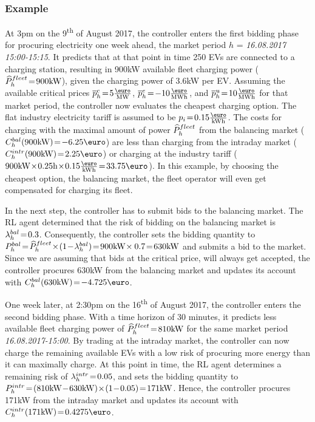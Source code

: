 \documentclass[a4paper, 12pt]{article}
\begin{document}
\subsubsection{Example}
\label{sec:orgff0a933}
At 3pm on the 9\textsuperscript{th} of August 2017, the controller enters the first bidding
phase for procuring electricity one week ahead, the market period \(h\) =
\emph{16.08.2017 15:00-15:15}. It predicts that at that point in time 250 EVs are connected
to a charging station, resulting in 900kW available fleet charging power
(\(\widehat{P}^{fleet}_{h}\!=\!900\text{kW}\)), given the charging power of 3.6kW per EV. Assuming the
available critical prices \(\ccp{h}\!=\!5\emw\), \(\cep{h}\!=\!-10\emwh\), and
\(\cup{h}\!=\!10\emwh\) for that market period, the controller now evaluates the
cheapest charging option. The flat industry electricity tariff is assumed to be
\(p_i\!=\!0.15\ekwh\). The costs for charging with the maximal amount of power
\(\widehat{P}^{fleet}_{h}\) from the balancing market (\(\Cb{h}(900\kw)\!=\!-6.25\eur\)) are less
than charging from the intraday market (\(\Ci{h}(900\kw)\!=\!2.25\eur\)) or
charging at the industry tariff
(\(900\kw\!\times\!0.25\text{h}\!\times\!0.15\ekwh\!=\!33.75\eur\)). In this
example, by choosing the cheapest option, the balancing market, the fleet
operator will even get compensated for charging its fleet.

In the next step, the controller has to submit bids to the balancing market. The
RL agent determined that the risk of bidding on the balancing market is
\(\lambda^{bal}_{h}\!=\!0.3\). Consequently, the controller sets the bidding quantity to
\(\Pb{h}\!=\!\fPhat{h}\!\times\!(1\!-\!\lb{h})\!=\!900\kw\!\times0.7\!=\!630\kw\) and
submits a bid to the market. Since we are assuming that bids at the critical
price, will always get accepted, the controller procures 630kW from the
balancing market and updates its account with \(\Cb{h}(630\kw)\!=\!-4.725\eur\).

One week later, at 2:30pm on the 16\textsuperscript{th} of August 2017, the controller enters
the second bidding phase. With a time horizon of 30 minutes, it predicts less
available fleet charging power of \(\widehat{P}^{fleet}_{h}\!=\!810\text{kW}\) for the same market
period \emph{16.08.2017-15:00}. By trading at the intraday market, the controller can
now charge the remaining available EVs with a low risk of procuring more energy
than it can maximally charge. At this point in time, the RL agent determines a
remaining risk of \(\lambda^{intr}_{h}\!=\!0.05\), and sets the bidding quantity to
\(\Pi{h}\!=\!(810\kw\!-\!630\kw)\!\times\!(1\!-\!0.05)\!=\!171\kw\). Hence, the
controller procures 171kW from the intraday market and updates its account with
\(\Ci{h}(171\kw)\!=\!0.4275\eur\).
\end{document}
